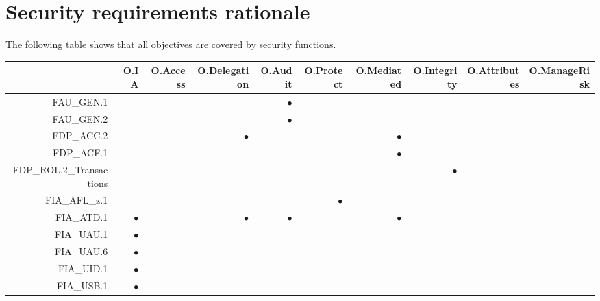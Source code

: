 \documentclass[12pt,english]{scrbook}
\newcommand{\oh}{$\bullet$}
\begin{document}
\section{Security requirements rationale}

The following table shows that all objectives are covered by security
functions.

\begin{longtable}{r|R|R|R|R|R|R|R|R|R|}
        \toprule
                            & O.IA & O.Access & O.Delegation & O.Audit & O.Protect & O.Mediated & O.Integrity & O.Attributes & O.ManageRisk \\
        \midrule\endhead

FAU\_GEN.1                  &      &          &             & \oh     &           &          &             &              &              \\
FAU\_GEN.2                  &      &          &             & \oh     &           &          &             &              &              \\
FDP\_ACC.2                  &      &          & \oh         &         &           & \oh      &             &              &              \\
FDP\_ACF.1                  &      &          &   &         &           &  \oh     &             &              &              \\
FDP\_ROL.2\_Transactions    &      &          &   &         &           &          &   \oh       &              &              \\
FIA\_AFL\_z.1               &      &          &   &         &   \oh     &          &             &              &              \\
FIA\_ATD.1                  & \oh  &          & \oh & \oh   &           & \oh      &             &              &              \\
FIA\_UAU.1                  & \oh  &          &    &         &           &          &             &              &              \\
FIA\_UAU.6                  & \oh  &          &    &         &           &          &             &              &              \\
FIA\_UID.1                  & \oh  &          &    &         &           &          &             &              &              \\
FIA\_USB.1                  & \oh  &          &    &         &           &          &             &              &              \\

\end{longtable}
\end{document}
